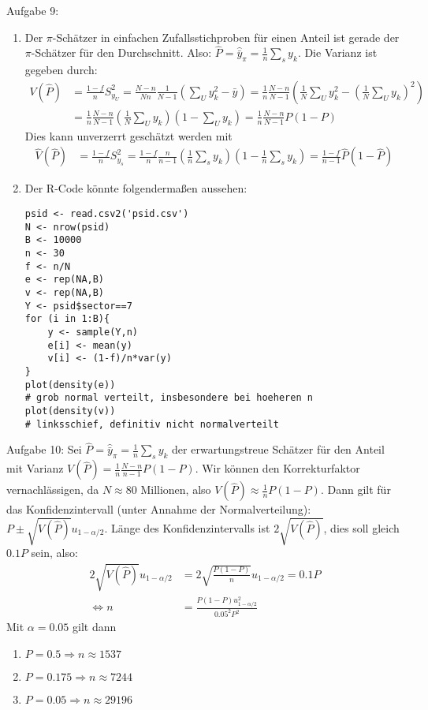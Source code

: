 \begin{Solution}{{Aufgabe 9:}}
	\begin{enumerate}
\item Der $\pi$-Schätzer in einfachen Zufallsstichproben für einen Anteil ist gerade der $\pi$-Schätzer für den Durchschnitt. Also: $\hat{P}=\hat{\bar{y}}_\pi = \frac{1}{n}\sum_s y_k$. Die Varianz ist gegeben durch:
\begin{align*}
V(\hat{P}) &= \frac{1-f}{n} S_{y_U}^2 = \frac{N-n}{Nn}\frac{1}{N-1}\left(\sum_U y_k^2-\bar{y}\right) = \frac{1}{n}\frac{N-n}{N-1}\left(\frac{1}{N}\sum_U y_k^2 - \left(\frac{1}{N}\sum_U y_k\right)^2\right)\\
&=\frac{1}{n}\frac{N-n}{N-1} \left(\frac{1}{N}\sum_U y_k\right)\left(1-\sum_U y_k\right) = \frac{1}{n}\frac{N-n}{N-1} P(1-P)
\end{align*}
Dies kann unverzerrt geschätzt werden mit
\begin{align*}
\hat{V}(\hat{P}) &= \frac{1-f}{n}S_{y_s}^2 = \frac{1-f}{n}\frac{n}{n-1}\left(\frac{1}{n}\sum_s y_k\right)\left(1-\frac{1}{n}\sum_s y_k\right) = \frac{1-f}{n-1}\hat{P}(1-\hat{P})
\end{align*}
\item Der R-Code könnte folgendermaßen aussehen:
\begin{lstlisting}
psid <- read.csv2('psid.csv')
N <- nrow(psid)
B <- 10000
n <- 30
f <- n/N
e <- rep(NA,B)
v <- rep(NA,B)
Y <- psid$sector==7
for (i in 1:B){
	y <- sample(Y,n)
	e[i] <- mean(y)
	v[i] <- (1-f)/n*var(y)
}
plot(density(e))
# grob normal verteilt, insbesondere bei hoeheren n
plot(density(v))
# linksschief, definitiv nicht normalverteilt
\end{lstlisting}
\end{enumerate}
\end{Solution}
\begin{Solution}{{Aufgabe 10:}}
Sei $\hat{P}=\hat{\bar{y}}_\pi=\frac{1}{n}\sum_s y_k$ der erwartungstreue Schätzer für den Anteil mit Varianz $V(\hat{P}) = \frac{1}{n} \frac{N-n}{n-1}P(1-P) $. Wir können den Korrekturfaktor vernachlässigen, da $N\approx 80$ Millionen, also  $V(\hat{P}) \approx \frac{1}{n}P(1-P)$. Dann gilt für das Konfidenzintervall (unter Annahme der Normalverteilung): $P \pm \sqrt{V(\hat{P})} u_{1-\alpha/2}$. Länge des Konfidenzintervalls ist $2 \sqrt{V(\hat{P})}$, dies soll gleich $0.1 P$ sein, also:
\begin{align*}
2 \sqrt{V(\hat{P})} u_{1-\alpha/2} &= 2 \sqrt{\frac{P(1-P)}{n}}u_{1-\alpha/2}=0.1P\\
\Leftrightarrow n &= \frac{P(1-P)u_{1-\alpha/2}^2}{0.05^2 P^2}
\end{align*}
Mit $\alpha=0.05$ gilt dann
\begin{enumerate}
	\item $P=0.5 \Rightarrow n \approx 1537$
	\item $P=0.175 \Rightarrow n \approx 7244$
	\item $P=0.05 \Rightarrow n \approx 29196$
\end{enumerate}
\end{Solution}
